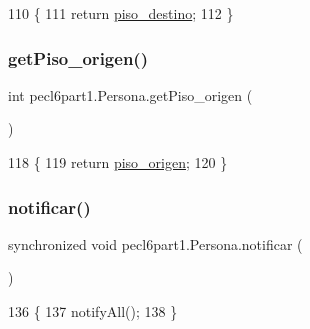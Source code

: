 \begin{DoxyCode}
110                                  \{
111         \textcolor{keywordflow}{return} \mbox{\hyperlink{classpecl6part1_1_1_persona_a2601b87adc4d07c03478b8a5dec4289e}{piso\_destino}};
112     \}
\end{DoxyCode}
\mbox{\label{classpecl6part1_1_1_persona_a0d9f25e9600c220763f05428a268c3d9}} 
\subsubsection{\texorpdfstring{get\+Piso\+\_\+origen()}{getPiso\_origen()}}
{\footnotesize\ttfamily int pecl6part1.\+Persona.\+get\+Piso\+\_\+origen (\begin{DoxyParamCaption}{ }\end{DoxyParamCaption})\hspace{0.3cm}{\ttfamily [inline]}}


\begin{DoxyCode}
118                                 \{
119         \textcolor{keywordflow}{return} \mbox{\hyperlink{classpecl6part1_1_1_persona_a6a8187e7b1c423eb263a336a573d634f}{piso\_origen}};
120     \}
\end{DoxyCode}
\mbox{\label{classpecl6part1_1_1_persona_a46859003cc6e2579a8f78d4c216a1082}} 
\subsubsection{\texorpdfstring{notificar()}{notificar()}}
{\footnotesize\ttfamily synchronized void pecl6part1.\+Persona.\+notificar (\begin{DoxyParamCaption}{ }\end{DoxyParamCaption})\hspace{0.3cm}{\ttfamily [inline]}}


\begin{DoxyCode}
136     \{
137         notifyAll();
138     \}
\end{DoxyCode}
\mbox{\label{classpecl6part1_1_1_persona_ad51df606a3a8ed3e880c3405209ae188}} 
